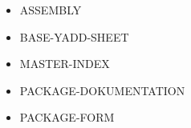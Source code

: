 \documentclass [11pt]{book}
\begin{document}
\label{subsec:objectdefinitions}



\begin{itemize}

\item {}ASSEMBLY

\item {}BASE-YADD-SHEET

\item {}MASTER-INDEX

\item {}PACKAGE-DOKUMENTATION

\item {}PACKAGE-FORM

\end{itemize}





\backmatter



\printindex
\end{document}
